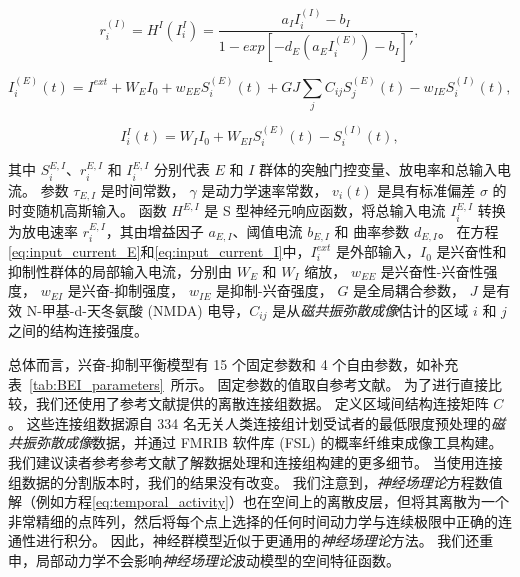 \documentclass[lang=cn,a4paper,newtx,citestyle=gb7714-2015, bibstyle=gb7714-2015]{elegantpaper}
\begin{document}
\begin{equation}\label{eq:firing_rate_I}
	r_i^{(I)} = H^{I} (I_i^{I}) = \frac{a_I I_i^{(I)} - b_I}{1 - exp[-d_E (a_E I_i^{(E)}) - b_I]'},
\end{equation}

\begin{equation}\label{eq:input_current_E}
	I_i^{(E)}(t) = I^{ext} + W_E I_0 + w_{EE} S_i^{(E)} (t) + G J \sum_j C_{ij} S_j^{(E)}(t) - w_{IE} S_i^{(I)} (t), 
\end{equation}

\begin{equation}\label{eq:input_current_I}
	I_i^{I} (t) = W_I I_0 +
				  W_{EI} S_i^{(E)} (t) - 
				  S_i^{(I)} (t),
\end{equation}

其中 $ S_i^{E,I} $、$ r_i^{E, I} $ 和 $ I_i^{E, I} $ 分别代表 $ E $ 和 $ I $ 群体的突触门控变量、放电率和总输入电流。
参数 $ \tau_{E,I} $ 是时间常数，
$ \gamma $ 是动力学速率常数，
$ v_i (t) $ 是具有标准偏差 $ \sigma $ 的时变随机高斯输入。
函数 $ H^{E,I} $ 是 S 型神经元响应函数，将总输入电流 $ I_i^{E,I} $ 转换为放电速率 $ r_i^{E,I} $，其由增益因子 $ a_{E,I} $、阈值电流 $ b_{E,I} $ 和 曲率参数 $ d_{E,I} $。
在方程\ref{eq:input_current_E}和\ref{eq:input_current_I}中，$ I_i^{ext} $ 是外部输入，$ I_0 $ 是兴奋性和抑制性群体的局部输入电流，分别由 $ W_E $ 和 $ W_I $ 缩放，
$ w_{EE} $ 是兴奋性-兴奋性强度，
$ w_{EI} $ 是兴奋-抑制强度，
$ w_{IE} $ 是抑制-兴奋强度，
$ G $ 是全局耦合参数，
$ J $ 是有效 N-甲基-d-天冬氨酸 (NMDA) 电导，$ C_{ij} $ 是从\textit{磁共振弥散成像}估计的区域 $ i $ 和 $ j $ 之间的结构连接强度。


总体而言，兴奋-抑制平衡模型有 15 个固定参数和 4 个自由参数，如补充表~\ref{tab:BEI_parameters}~所示。
固定参数的值取自参考文献\cite{demirtacs2019hierarchical}。
为了进行直接比较，我们还使用了参考文献\cite{demirtacs2019hierarchical}提供的离散连接组数据。
定义区域间结构连接矩阵 $ C $。
这些连接组数据源自 334 名无关人类连接组计划受试者的最低限度预处理的\textit{磁共振弥散成像}数据，并通过 FMRIB 软件库 (FSL)\cite{behrens2003characterization} 的概率纤维束成像工具构建。 
我们建议读者参考参考文献\cite{demirtacs2019hierarchical}了解数据处理和连接组构建的更多细节。
当使用连接组数据的分割版本时，我们的结果没有改变。
我们注意到，\textit{神经场理论}方程数值解（例如方程\ref{eq:temporal_activity}）也在空间上的离散皮层，但将其离散为一个非常精细的点阵列，然后将每个点上选择的任何时间动力学与连续极限中正确的连通性进行积分。
因此，神经群模型近似于更通用的\textit{神经场理论}方法\cite{deco2008dynamic,spiegler2013systematic}。 
我们还重申，局部动力学不会影响\textit{神经场理论}波动模型的空间特征函数。
\end{document}

